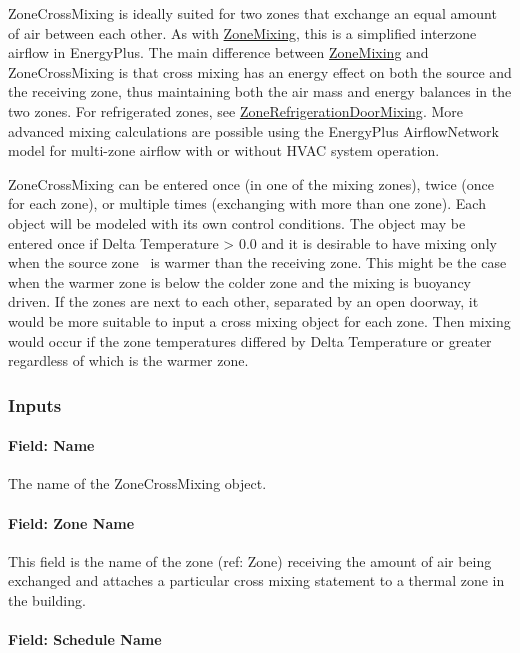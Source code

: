 ZoneCrossMixing is ideally suited for two zones that exchange an equal amount of air between each other. As with \hyperref[zonemixing]{ZoneMixing}, this is a simplified interzone airflow in EnergyPlus. The main difference between \hyperref[zonemixing]{ZoneMixing} and ZoneCrossMixing is that cross mixing has an energy effect on both the source and the receiving zone, thus maintaining both the air mass and energy balances in the two zones. For refrigerated zones, see \hyperref[zonerefrigerationdoormixing]{ZoneRefrigerationDoorMixing}. More advanced mixing calculations are possible using the EnergyPlus AirflowNetwork model for multi-zone airflow with or without HVAC system operation.

ZoneCrossMixing can be entered once (in one of the mixing zones), twice (once for each zone), or multiple times (exchanging with more than one zone). Each object will be modeled with its own control conditions. The object may be entered once if Delta Temperature \textgreater{} 0.0 and it is desirable to have mixing only when the source zone~ is warmer than the receiving zone. This might be the case when the warmer zone is below the colder zone and the mixing is buoyancy driven. If the zones are next to each other, separated by an open doorway, it would be more suitable to input a cross mixing object for each zone. Then mixing would occur if the zone temperatures differed by Delta Temperature or greater regardless of which is the warmer zone.

\subsubsection{Inputs}\label{inputs-6-003}

\paragraph{Field: Name}\label{field-name-6-003}

The name of the ZoneCrossMixing object.

\paragraph{Field: Zone Name}\label{field-zone-name-4}

This field is the name of the zone (ref: Zone) receiving the amount of air being exchanged and attaches a particular cross mixing statement to a thermal zone in the building.

\paragraph{Field: Schedule Name}\label{field-schedule-name-4}

